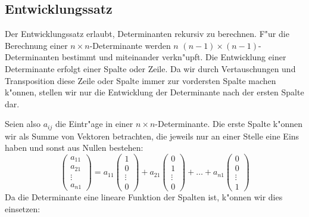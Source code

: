 \subsection{Entwicklungssatz\label{entwicklungssatz}}
Der Entwicklungssatz erlaubt, Determinanten rekursiv zu berechnen.
F"ur die Berechnung einer $n\times n$-Determinante werden $n$
$(n-1)\times(n-1)$-Determinanten bestimmt und miteinander verkn"upft.
Die Entwicklung einer Determinante erfolgt einer Spalte oder Zeile.
Da wir durch Vertauschungen und Transposition diese Zeile oder Spalte
immer zur vordersten Spalte machen k"onnen, stellen wir nur die
Entwicklung der Determinante nach der ersten Spalte dar.

Seien also $a_{ij}$ die Eintr"age in einer $n\times n$-Determinante.
Die erste Spalte k"onnen wir als Summe von Vektoren betrachten,
die jeweils nur an einer Stelle eine Eins haben und sonst aus
Nullen bestehen:
\[
\begin{pmatrix}
a_{11}\\a_{21}\\\vdots\\a_{n1}
\end{pmatrix}
=
a_{11}\begin{pmatrix}1\\0\\\vdots\\0\end{pmatrix}
+
a_{21}\begin{pmatrix}0\\1\\\vdots\\0\end{pmatrix}
+
\dots
+
a_{n1}\begin{pmatrix}0\\0\\\vdots\\1\end{pmatrix}
\]
Da die Determinante eine lineare Funktion der Spalten ist,
k"onnen wir dies einsetzen:
